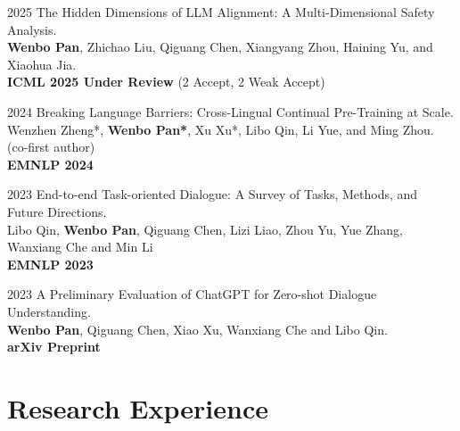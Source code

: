 \documentclass[11pt,letterpaper]{report}
\begin{document}
\begin{tablist}
    
\item[2025] \tab{}The Hidden Dimensions of LLM Alignment: A Multi-Dimensional Safety Analysis. \\ \textbf{Wenbo Pan}, Zhichao Liu, Qiguang Chen, Xiangyang Zhou, Haining Yu, and Xiaohua Jia. \\ \textbf{ICML 2025 Under Review} (2 Accept, 2 Weak Accept)\\

\item[2024] \tab{}Breaking Language Barriers: Cross-Lingual Continual Pre-Training at Scale. \\ Wenzhen Zheng*, \textbf{Wenbo Pan*}, Xu Xu*, Libo Qin, Li Yue, and Ming Zhou. (co-first author) \\ \textbf{EMNLP 2024}  \\

\item[2023] \tab{}End-to-end Task-oriented Dialogue: A Survey of Tasks, Methods, and Future Directions. \\ Libo Qin, \textbf{Wenbo Pan}, Qiguang Chen, Lizi Liao, Zhou Yu, Yue Zhang, Wanxiang Che and Min Li \\ \textbf{EMNLP 2023} \\

\item[2023] \tab{}A Preliminary Evaluation of ChatGPT for Zero-shot Dialogue Understanding. \\ \textbf{Wenbo Pan}, Qiguang Chen, Xiao Xu, Wanxiang Che and Libo Qin. \\ \textbf{arXiv Preprint} \\


\end{tablist}

\section*{Research Experience}
\end{document}
